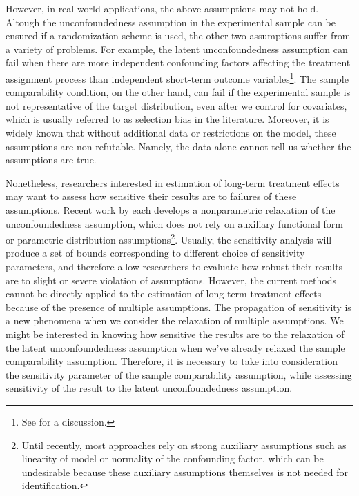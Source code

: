 \documentclass[12pt]{article}
\begin{document}
	However, in real-world applications, the above assumptions may not hold. Altough the unconfoundedness assumption in the experimental sample can be ensured if a randomization scheme is used, the other two assumptions suffer from a variety of problems. For example, the latent unconfoundedness assumption can fail when there are more independent confounding factors affecting the treatment assignment process than independent short-term outcome variables\footnote{See \textcite{athey2020combining} for a discussion.}. The sample comparability condition, on the other hand, can fail if the experimental sample is not representative of the target distribution, even after we control for covariates, which is usually referred to as selection bias in the literature. Moreover, it is widely known that without additional data or restrictions on the model, these assumptions are non-refutable. Namely, the data alone cannot tell us whether the assumptions are true. 
	
	Nonetheless, researchers interested in estimation of long-term treatment effects may want to assess how sensitive their results are to failures of these assumptions. Recent work by \textcite{masten2018identification, yadlowsky2018bounds, kallus2018confounding} each develops a nonparametric relaxation of the unconfoundedness assumption, which does not rely on auxiliary functional form or parametric distribution assumptions\footnote{Until recently, most approaches rely on strong auxiliary assumptions such as linearity of model or normality of the confounding factor, which can be undesirable because these auxiliary assumptions themselves is not needed for identification. }. Usually, the sensitivity analysis will produce a set of bounds corresponding to different choice of sensitivity parameters, and therefore allow researchers to evaluate how robust their results are to slight or severe violation of assumptions. However, the current methods cannot be directly applied to the estimation of long-term treatment effects because of the presence of multiple assumptions. The propagation of sensitivity is a new phenomena when we consider the relaxation of multiple assumptions. We might be interested in knowing how sensitive the results are to the relaxation of the latent unconfoundedness assumption when we've already relaxed the sample comparability assumption. Therefore, it is necessary to take into consideration the sensitivity parameter of the sample comparability assumption, while assessing sensitivity of the result to the latent unconfoundedness assumption. 
    
\end{document}
